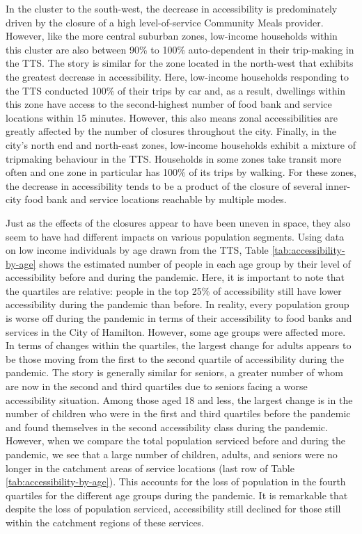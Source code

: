 \documentclass[]{elsarticle} %
\begin{document}
In the cluster to the south-west, the decrease in accessibility is
predominately driven by the closure of a high level-of-service Community
Meals provider. However, like the more central suburban zones,
low-income households within this cluster are also between 90\% to 100\%
auto-dependent in their trip-making in the TTS. The story is similar for
the zone located in the north-west that exhibits the greatest decrease
in accessibility. Here, low-income households responding to the TTS
conducted 100\% of their trips by car and, as a result, dwellings within
this zone have access to the second-highest number of food bank and
service locations within 15 minutes. However, this also means zonal
accessibilities are greatly affected by the number of closures
throughout the city. Finally, in the city's north end and north-east
zones, low-income households exhibit a mixture of tripmaking behaviour
in the TTS. Households in some zones take transit more often and one
zone in particular has 100\% of its trips by walking. For these zones,
the decrease in accessibility tends to be a product of the closure of
several inner-city food bank and service locations reachable by multiple
modes.

Just as the effects of the closures appear to have been uneven in space,
they also seem to have had different impacts on various population
segments. Using data on low income individuals by age drawn from the
TTS, Table \ref{tab:accessibility-by-age} shows the estimated number of
people in each age group by their level of accessibility before and
during the pandemic. Here, it is important to note that the quartiles
are relative: people in the top 25\% of accessibility still have lower
accessibility during the pandemic than before. In reality, every
population group is worse off during the pandemic in terms of their
accessibility to food banks and services in the City of Hamilton.
However, some age groups were affected more. In terms of changes within
the quartiles, the largest change for adults appears to be those moving
from the first to the second quartile of accessibility during the
pandemic. The story is generally similar for seniors, a greater number
of whom are now in the second and third quartiles due to seniors facing
a worse accessibility situation. Among those aged 18 and less, the
largest change is in the number of children who were in the first and
third quartiles before the pandemic and found themselves in the second
accessibility class during the pandemic. However, when we compare the
total population serviced before and during the pandemic, we see that a
large number of children, adults, and seniors were no longer in the
catchment areas of service locations (last row of Table
\ref{tab:accessibility-by-age}). This accounts for the loss of
population in the fourth quartiles for the different age groups during
the pandemic. It is remarkable that despite the loss of population
serviced, accessibility still declined for those still within the
catchment regions of these services.
\end{document}
